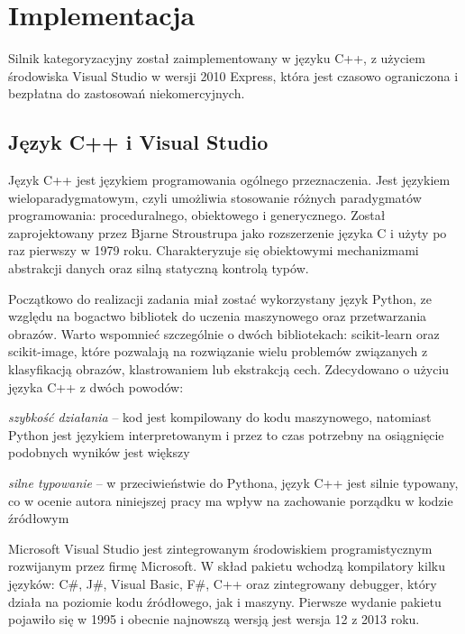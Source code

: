 \chapter{Implementacja}

Silnik kategoryzacyjny został zaimplementowany w języku C++, z użyciem środowiska Visual Studio w wersji 2010 Express, która jest czasowo ograniczona i bezpłatna do zastosowań niekomercyjnych.

\section{Język C++ i Visual Studio}

Język C++ jest językiem programowania ogólnego przeznaczenia. Jest językiem wieloparadygmatowym, czyli umożliwia stosowanie różnych paradygmatów programowania: proceduralnego, obiektowego i generycznego. Został zaprojektowany przez Bjarne Stroustrupa jako rozszerzenie języka C i użyty po raz pierwszy w 1979 roku. Charakteryzuje się obiektowymi mechanizmami abstrakcji danych oraz silną statyczną kontrolą typów.

Początkowo do realizacji zadania miał zostać wykorzystany język Python, ze względu na bogactwo bibliotek do uczenia maszynowego oraz przetwarzania obrazów. Warto wspomnieć szczególnie o dwóch bibliotekach: scikit-learn oraz scikit-image, które pozwalają na rozwiązanie wielu problemów związanych z klasyfikacją obrazów, klastrowaniem lub ekstrakcją cech. Zdecydowano o użyciu języka C++ z dwóch powodów:

\begin{compactitem}
	\item \emph{szybkość działania} -- kod jest kompilowany do kodu maszynowego, natomiast Python jest językiem interpretowanym i przez to czas potrzebny na osiągnięcie podobnych wyników jest większy
	\item \emph{silne typowanie} -- w przeciwieństwie do Pythona, język C++ jest silnie typowany, co w ocenie autora niniejszej pracy ma wpływ na zachowanie porządku w kodzie źródłowym
\end{compactitem}

Microsoft Visual Studio jest zintegrowanym środowiskiem programistycznym rozwijanym przez firmę Microsoft. W skład pakietu wchodzą kompilatory kilku języków: C\#, J\#, Visual Basic, F\#, C++ oraz zintegrowany debugger, który działa na poziomie kodu źródłowego, jak i maszyny. Pierwsze wydanie pakietu pojawiło się w 1995 i obecnie najnowszą wersją jest wersja 12 z 2013 roku. 

